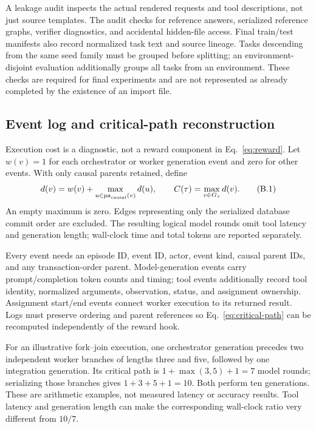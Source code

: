 A leakage audit inspects the actual rendered requests and tool descriptions, not just source templates. The audit checks for reference answers, serialized reference graphs, verifier diagnostics, and accidental hidden-file access. Final train/test manifests also record normalized task text and source lineage. Tasks descending from the same seed family must be grouped before splitting; an environment-disjoint evaluation additionally groups all tasks from an environment. These checks are required for final experiments and are not represented as already completed by the existence of an import file.

\subsection{Event log and critical-path reconstruction}

Execution cost is a diagnostic, not a reward component in Eq.~\ref{eq:reward}. Let $w(v)=1$ for each orchestrator or worker generation event and zero for other events. With only causal parents retained, define
\begin{equation}
 d(v)=w(v)+\max_{u\in\operatorname{pa}_{\rm causal}(v)}d(u),\qquad C(\tau)=\max_{v\in G_\tau}d(v).
 \tag{B.1}\label{eq:critical-path}
\end{equation}
An empty maximum is zero. Edges representing only the serialized database commit order are excluded. The resulting logical model rounds omit tool latency and generation length; wall-clock time and total tokens are reported separately.


Every event needs an episode ID, event ID, actor, event kind, causal parent IDs, and any transaction-order parent. Model-generation events carry prompt/completion token counts and timing; tool events additionally record tool identity, normalized arguments, observation, status, and assignment ownership. Assignment start/end events connect worker execution to its returned result. Logs must preserve ordering and parent references so Eq.~\ref{eq:critical-path} can be recomputed independently of the reward hook.

For an illustrative fork--join execution, one orchestrator generation precedes two independent worker branches of lengths three and five, followed by one integration generation. Its critical path is $1+\max(3,5)+1=7$ model rounds; serializing those branches gives $1+3+5+1=10$. Both perform ten generations. These are arithmetic examples, not measured latency or accuracy results. Tool latency and generation length can make the corresponding wall-clock ratio very different from $10/7$.

